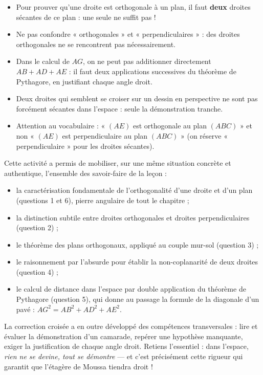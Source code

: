 \documentclass[11pt]{article}
\newcommand{\cle}[1]{{\popxbold\color{popdark}#1}}
\newcounter{popsec}
\newcounter{popsub}
\newcommand{\courssub}[1]{%
  \stepcounter{popsub}%
  \par\vspace{9pt}\noindent{\popxbold\fontsize{11.5}{13}\selectfont\color{popink}{\color{poporange}\thepopsec.\thepopsub}\hspace{6pt}#1}\par\nopagebreak\vspace{4pt}
}
\begin{document}
\begin{attention}
\begin{itemize}
\item Pour prouver qu'une droite est orthogonale à un plan, il faut \textbf{deux} droites sécantes de ce plan : une seule ne suffit pas !
\item Ne pas confondre « orthogonales » et « perpendiculaires » : des droites orthogonales ne se rencontrent pas nécessairement.
\item Dans le calcul de $AG$, on ne peut pas additionner directement $AB + AD + AE$ : il faut deux applications successives du théorème de Pythagore, en justifiant chaque angle droit.
\item Deux droites qui semblent se croiser sur un dessin en perspective ne sont pas forcément sécantes dans l'espace : seule la démonstration tranche.
\item Attention au vocabulaire : « $(AE)$ est orthogonale au plan $(ABC)$ » et non « $(AE)$ est perpendiculaire au plan $(ABC)$ » (on réserve « perpendiculaire » pour les droites sécantes).
\end{itemize}
\end{attention}

\courssub{Bilan de l'activité}

Cette activité a permis de mobiliser, sur une même situation concrète et authentique, l'ensemble des savoir-faire de la leçon :

\begin{itemize}
\item la \cle{caractérisation fondamentale} de l'orthogonalité d'une droite et d'un plan (questions 1 et 6), pierre angulaire de tout le chapitre ;
\item la distinction subtile entre droites \cle{orthogonales} et droites \cle{perpendiculaires} (question 2) ;
\item le théorème des \cle{plans orthogonaux}, appliqué au couple mur-sol (question 3) ;
\item le raisonnement par l'absurde pour établir la \cle{non-coplanarité} de deux droites (question 4) ;
\item le calcul de \cle{distance} dans l'espace par double application du théorème de Pythagore (question 5), qui donne au passage la formule de la diagonale d'un pavé : $AG^2 = AB^2 + AD^2 + AE^2$.
\end{itemize}

La correction croisée a en outre développé des compétences transversales : lire et évaluer la démonstration d'un camarade, repérer une hypothèse manquante, exiger la justification de chaque angle droit. Retiens l'essentiel : dans l'espace, \emph{rien ne se devine, tout se démontre} — et c'est précisément cette rigueur qui garantit que l'étagère de Moussa tiendra droit !
\end{document}
